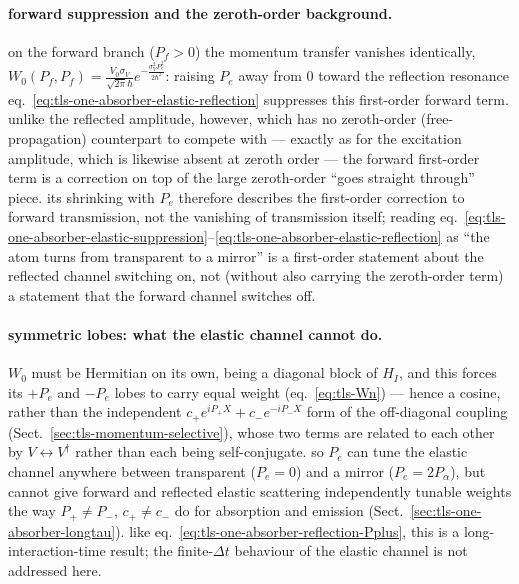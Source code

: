 \paragraph{forward suppression and the zeroth-order background.} on the forward branch ($P_f>0$) the momentum transfer vanishes identically, $W_0(P_f,P_f) = \frac{V_0\sigma_V}{\sqrt{2\pi}\hbar}e^{-\frac{\sigma_V^2P_e^2}{2\hbar^2}}$: raising $P_e$ away from $0$ toward the reflection resonance eq.~\eqref{eq:tls-one-absorber-elastic-reflection} suppresses this first-order forward term. unlike the reflected amplitude, however, which has no zeroth-order (free-propagation) counterpart to compete with --- exactly as for the excitation amplitude, which is likewise absent at zeroth order --- the forward first-order term is a correction on top of the large zeroth-order ``goes straight through'' piece. its shrinking with $P_e$ therefore describes the first-order correction to forward transmission, not the vanishing of transmission itself; reading eq.~\eqref{eq:tls-one-absorber-elastic-suppression}--\eqref{eq:tls-one-absorber-elastic-reflection} as ``the atom turns from transparent to a mirror'' is a first-order statement about the reflected channel switching on, not (without also carrying the zeroth-order term) a statement that the forward channel switches off.

\paragraph{symmetric lobes: what the elastic channel cannot do.} $W_0$ must be Hermitian on its own, being a diagonal block of $H_I$, and this forces its $+P_e$ and $-P_e$ lobes to carry equal weight (eq.~\eqref{eq:tls-Wn}) --- hence a cosine, rather than the independent $c_+e^{iP_+X}+c_-e^{-iP_-X}$ form of the off-diagonal coupling (Sect.~\ref{sec:tls-momentum-selective}), whose two terms are related to each other by $V\leftrightarrow V^\dag$ rather than each being self-conjugate. so $P_e$ can tune the elastic channel anywhere between transparent ($P_e=0$) and a mirror ($P_e=2P_\alpha$), but cannot give forward and reflected elastic scattering independently tunable weights the way $P_+\ne P_-$, $c_+\ne c_-$ do for absorption and emission (Sect.~\ref{sec:tls-one-absorber-longtau}). like eq.~\eqref{eq:tls-one-absorber-reflection-Pplus}, this is a long-interaction-time result; the finite-$\Delta t$ behaviour of the elastic channel is not addressed here.
